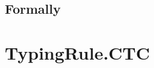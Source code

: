 \documentclass{book}
\begin{document}
\begin{itemize}

\begin{emptyformal}
    \subsection{Formally}
\end{emptyformal}


\section{TypingRule.CTC \label{sec:TypingRule.CTC}}


\end{itemize}
\end{document}
